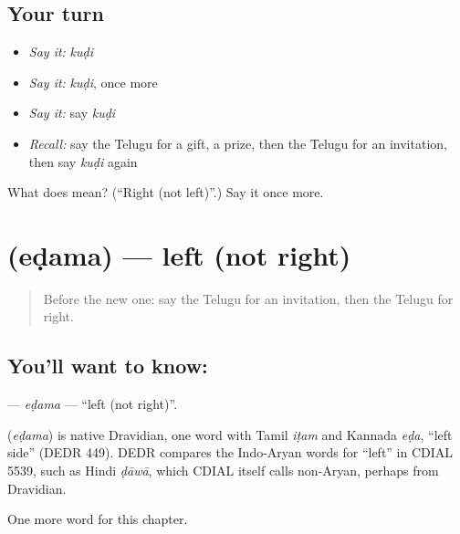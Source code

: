 \subsection*{Your turn}
\begin{itemize}
\raggedright
  \item \emph{Say it:} \emph{kuḍi}
  \item \emph{Say it:} \emph{kuḍi}, once more
  \item \emph{Say it:} say \emph{kuḍi}
  \item \emph{Recall:} say the Telugu for a gift, a prize, then the Telugu for an invitation, then say \emph{kuḍi} again
\end{itemize}

\begin{tcolorbox}[breakable,colback=teal!4,colframe=teal!35!black,title={Before you move on}]
What does  mean? (\textquotedblleft{}Right (not left)\textquotedblright{}.) Say it once more.
\end{tcolorbox}
\section[\texorpdfstring{\te{ఎడమ} (eḍama)}{ఎడమ (eḍama)}]{ (eḍama) — left (not right)}

\label{lesson:TE-C100-edama}



\begin{quote}
Before the new one: say the Telugu for an invitation, then the Telugu for right.
\end{quote}

\subsection*{You'll want to know: }
\textbf{} — \emph{eḍama} — \textquotedblleft{}left (not right)\textquotedblright{}.

\begin{cousinweb}
\textbf{} (\emph{eḍama}) is native Dravidian, one word with Tamil \emph{iṭam} and Kannada \emph{eḍa}, \textquotedblleft{}left side\textquotedblright{} (DEDR 449). DEDR compares the Indo-Aryan words for \textquotedblleft{}left\textquotedblright{} in CDIAL 5539, such as Hindi \emph{ḍāwā}, which CDIAL itself calls non-Aryan, perhaps from Dravidian.
\end{cousinweb}

\begin{grammarlens}[title={What you've built}]
One more word for this chapter.
\end{grammarlens}

